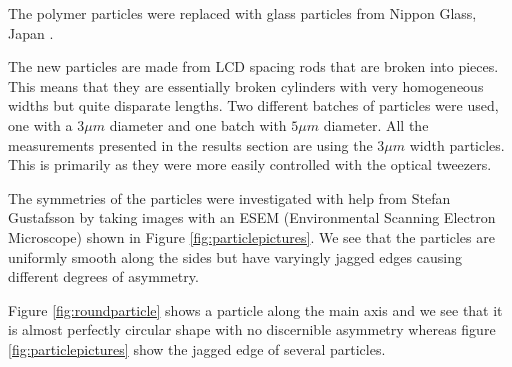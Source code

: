 The polymer particles were replaced with glass particles from Nippon Glass, Japan \cite{Particles}. 

The new particles are made from LCD spacing rods that are broken into pieces. This means that they are essentially broken cylinders with very homogeneous widths but quite disparate lengths. Two different batches of particles were used, one with a $3\mu m$ diameter and one batch with $5 \mu m$ diameter. All the measurements presented in the results section are using the $3 \mu m$ width particles. This is primarily as they were more easily controlled with the optical tweezers. 

The symmetries of the particles were investigated with help from Stefan Gustafsson by taking images with an 
ESEM (Environmental Scanning Electron Microscope) shown in Figure \ref{fig:particlepictures}. We see that the 
particles are uniformly smooth along the sides but have varyingly jagged edges causing different degrees of asymmetry. 

Figure \ref{fig:roundparticle} shows a particle along the main axis and we see that it is almost perfectly circular shape 
with no discernible asymmetry whereas figure \ref{fig:particlepictures} show the jagged edge of several particles. 


